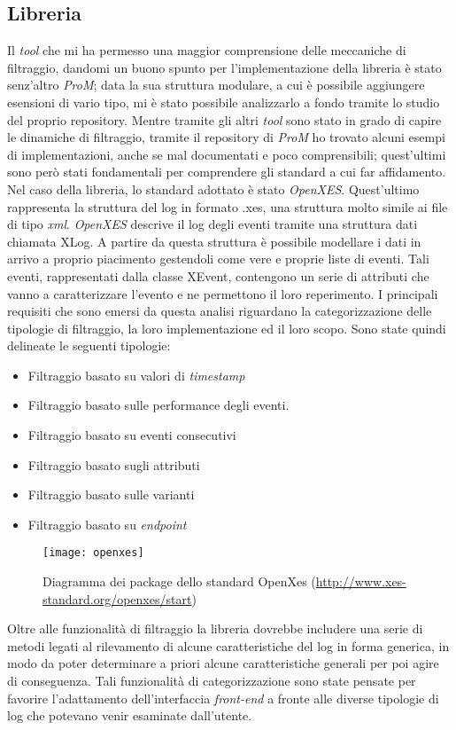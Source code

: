 \subsection{Libreria}
 Il \textit{tool} che mi ha permesso una maggior comprensione delle meccaniche di filtraggio, dandomi un buono spunto per l'implementazione della libreria è stato senz'altro \textit{ProM}; data la sua struttura modulare, a cui è possibile aggiungere esensioni di vario tipo, mi è stato possibile analizzarlo a fondo tramite lo studio del proprio repository. Mentre tramite gli altri \textit{tool} sono stato in grado di capire le dinamiche di filtraggio, tramite il repository di \textit{ProM} ho trovato alcuni esempi di implementazioni, anche se mal documentati e poco comprensibili; quest'ultimi sono però stati fondamentali per comprendere gli standard a cui far affidamento. Nel caso della libreria, lo standard adottato è stato \textit{OpenXES}. Quest'ultimo rappresenta la struttura del log in formato .xes, una struttura molto simile ai file di tipo \textit{xml}. \textit{OpenXES} descrive il log degli eventi tramite una struttura dati chiamata XLog. A partire da questa struttura è possibile modellare i dati in arrivo a proprio piacimento gestendoli come vere e proprie liste di eventi. Tali eventi, rappresentati dalla classe XEvent, contengono un serie di attributi che vanno a caratterizzare l'evento e ne permettono il loro reperimento. I principali requisiti che sono emersi da questa analisi riguardano la categorizzazione delle tipologie di filtraggio, la loro implementazione ed il loro scopo. Sono state quindi delineate le seguenti tipologie:
\begin{itemize}
	\item Filtraggio basato su valori di \textit{timestamp}
	\item Filtraggio basato sulle performance degli eventi.
	\item Filtraggio basato su eventi consecutivi
	\item Filtraggio basato sugli attributi
	\item Filtraggio basato sulle varianti
	\item Filtraggio basato su \textit{endpoint}
\end{itemize}
\begin{figure}[!h] 
	\centering 
	\texttt{[image: openxes]} 
	\caption{Diagramma dei package dello standard OpenXes (\url{http://www.xes-standard.org/openxes/start})}
\end{figure}
Oltre alle funzionalità di filtraggio la libreria dovrebbe includere una serie di metodi legati al rilevamento di alcune caratteristiche del log in forma generica, in modo da poter determinare a priori alcune caratteristiche generali per poi agire di conseguenza.
Tali funzionalità di categorizzazione sono state pensate per favorire l'adattamento dell'interfaccia \textit{front-end} a fronte alle diverse tipologie di log che potevano venir esaminate dall'utente.
